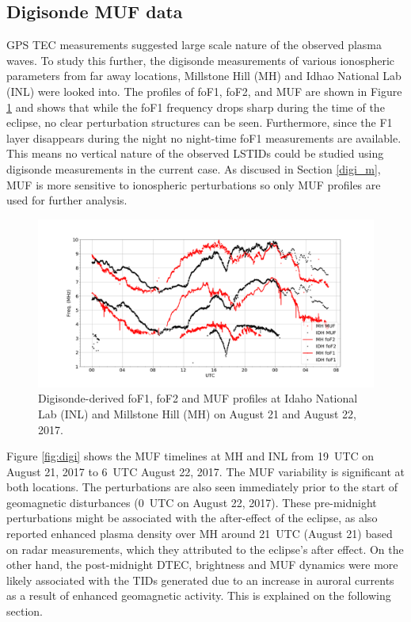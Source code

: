 \documentclass[crop=false,class=mitthesis,oneside,font=12pt]{standalone}
\begin{document}
\subsection{Digisonde MUF data}
GPS TEC measurements suggested large scale nature of the observed plasma waves. To study this further, the digisonde measurements of various ionospheric parameters from far away locations, Millstone Hill (MH) and Idhao National Lab (INL) were looked into. The profiles of foF1, foF2, and MUF are shown in Figure \ref{fig:digi_w} and shows that while the foF1 frequency drops sharp during the time of the eclipse, no clear perturbation structures can be seen. Furthermore, since the F1 layer disappears during the night no night-time foF1 measurements are available. This means no vertical nature of the observed LSTIDs could be studied using digisonde measurements in the current case. As discused in Section \ref{digi_m}, MUF is more sensitive to ionospheric perturbations so only MUF profiles are used for further analysis.
\begin{figure}[H]
\centering\includegraphics[width=35pc]{digi_21-22.png}
\caption{Digisonde-derived foF1, foF2 and MUF profiles at Idaho National Lab (INL) and Millstone Hill (MH)  on August 21 and August 22, 2017.}
\label{fig:digi_w}
\end{figure}

Figure \ref{fig:digi} shows the MUF timelines at MH and INL from 19~UTC on August 21, 2017 to 6~UTC August 22, 2017. The MUF variability is significant at both locations. The perturbations are also seen immediately prior to the start of geomagnetic disturbances (0~UTC on August 22, 2017). These pre-midnight perturbations might be associated with the after-effect of the eclipse, as \citet{goncharenko_mh_hill_eclipse} also reported enhanced plasma density over MH around 21~UTC (August 21) based on radar measurements, which they attributed to the eclipse's after effect. On the other hand, the post-midnight DTEC, brightness and MUF dynamics were more likely associated with the TIDs generated due to an increase in auroral currents as a result of enhanced geomagnetic activity. This is explained on the following section.
\end{document}

